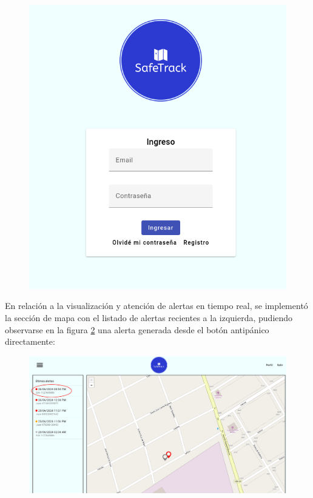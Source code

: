 \begin{figure}[H]
\begin{minipage}{.5\textwidth}
\end{minipage}%
\begin{minipage}{.5\textwidth}
  \centering
  \includegraphics[width=0.9\linewidth]{./Figures/login.png}
  \label{frontend:login}
\end{minipage}
\end{figure}


En relación a la visualización y atención de alertas en tiempo real, se implementó la sección de mapa con el listado de alertas recientes a la izquierda, pudiendo observarse en la figura \ref{fig:frontend:mapa} una alerta generada desde el botón antipánico directamente:

\begin{figure}[H]
	\centering
  	\includegraphics[width=1\linewidth]{./Figures/frontend-alerta.png}
  	\label{fig:frontend:mapa}
\end{figure}	
	
